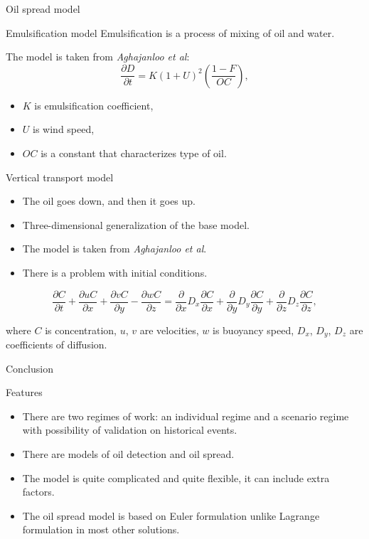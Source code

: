 \documentclass{beamer}
\begin{document}
\begin{section}{Oil spread model}
\begin{frame}{Emulsification model}
Emulsification is a process of mixing of oil and water.

The model is taken from \textit{Aghajanloo et al}:
$$\frac{\partial D}{\partial t} = K \left(1 + U\right)^2\left(\frac{1 - F}{OC}\right),$$
\begin{itemize}
	\item $K$ is emulsification coefficient, 
	\item $U$ is wind speed,
	\item $OC$ is a constant that characterizes type of oil.
\end{itemize}
\end{frame}

\begin{frame}{Vertical transport model}
\begin{itemize}
	\item The oil goes down, and then it goes up.
	\item Three-dimensional generalization of the base model.
	\item The model is taken from \textit{Aghajanloo et al}.
	\item There is a problem with initial conditions.
\end{itemize}

$$\frac{\partial C}{\partial t} + \frac{\partial u C}{\partial x} + \frac{\partial v C}{\partial y} - \frac{\partial w C}{\partial z} = \frac{\partial}{\partial x}D_x\frac{\partial C}{\partial x} + \frac{\partial}{\partial y}D_y\frac{\partial C}{\partial y} + \frac{\partial}{\partial z}D_z\frac{\partial C}{\partial z},$$

where $C$ is concentration, $u$, $v$ are velocities, $w$ is buoyancy speed, $D_x$, $D_y$, $D_z$ are coefficients of diffusion.
\end{frame}

\end{section}

\begin{section}{Conclusion}

\begin{frame}{Features}
	\begin{itemize}
		\item There are two regimes of work: an individual regime and a scenario regime with possibility of validation on historical events.
		\item There are models of oil detection and oil spread.
		\item The model is quite complicated and quite flexible, it can include extra factors.
		\item The oil spread model is based on Euler formulation unlike Lagrange formulation in most other solutions.
	\end{itemize}
\end{frame}

\end{section}
\end{document}
